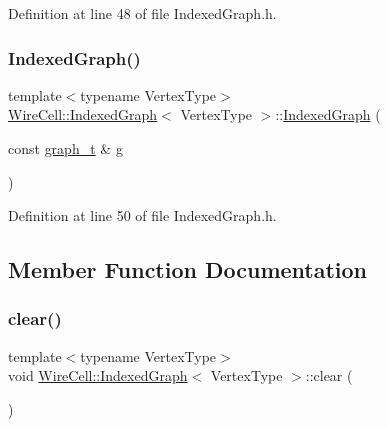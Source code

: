 Definition at line 48 of file Indexed\+Graph.\+h.

\mbox{\label{class_wire_cell_1_1_indexed_graph_a0bee33ff275af7255d0e7dafcc10d950}} 
\subsubsection{\texorpdfstring{Indexed\+Graph()}{IndexedGraph()}\hspace{0.1cm}{\footnotesize\ttfamily [2/2]}}
{\footnotesize\ttfamily template$<$typename Vertex\+Type$>$ \\
\hyperlink{class_wire_cell_1_1_indexed_graph}{Wire\+Cell\+::\+Indexed\+Graph}$<$ Vertex\+Type $>$\+::\hyperlink{class_wire_cell_1_1_indexed_graph}{Indexed\+Graph} (\begin{DoxyParamCaption}\item[{const \hyperlink{class_wire_cell_1_1_indexed_graph_a5593f08e4be84de33ebf37de7d071819}{graph\+\_\+t} \&}]{g }\end{DoxyParamCaption})\hspace{0.3cm}{\ttfamily [inline]}}



Definition at line 50 of file Indexed\+Graph.\+h.



\subsection{Member Function Documentation}
\mbox{\label{class_wire_cell_1_1_indexed_graph_adb8836f8e4ccae7a86b062a47dedb0a3}} 
\subsubsection{\texorpdfstring{clear()}{clear()}}
{\footnotesize\ttfamily template$<$typename Vertex\+Type$>$ \\
void \hyperlink{class_wire_cell_1_1_indexed_graph}{Wire\+Cell\+::\+Indexed\+Graph}$<$ Vertex\+Type $>$\+::clear (\begin{DoxyParamCaption}{ }\end{DoxyParamCaption})\hspace{0.3cm}{\ttfamily [inline]}}



